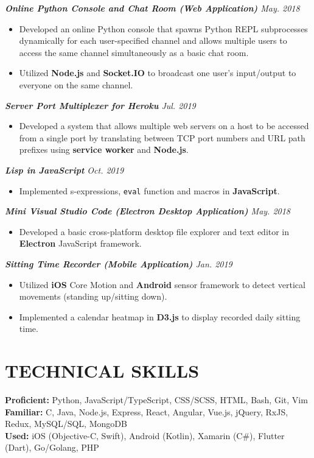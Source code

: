 \documentclass[10pt]{article}
\begin{document}
%
{\itshape {\bfseries Online Python Console and Chat Room (Web Application)}  \hfill May. 2018}
\begin{itemize}[leftmargin=15pt, noitemsep, topsep=0pt]
\item Developed an online Python console that spawns Python REPL subprocesses dynamically for each user-specified channel and allows multiple users to access the same channel simultaneously as a basic chat room.
\item Utilized \textbf{Node.js} and \textbf{Socket.IO} to broadcast one user’s input/output to everyone on the same channel.
\end{itemize}
\vspace{0.5em}
%
{\itshape {\bfseries Server Port Multiplexer for Heroku}  \hfill Jul. 2019}
\begin{itemize}[leftmargin=15pt, noitemsep, topsep=0pt]
\item Developed a system that allows multiple web servers on a host to be accessed from a single port by translating between TCP port numbers and URL path prefixes using \textbf{service worker} and \textbf{Node.js}. 
\end{itemize}
\vspace{0.2em}
%
{\itshape {\bfseries Lisp in JavaScript}  \hfill Oct. 2019}
\begin{itemize}[leftmargin=15pt, noitemsep, topsep=0pt]
\item Implemented s-expressions, \texttt{eval} function and macros in \textbf{JavaScript}.
\end{itemize}
\vspace{0.2em}
%
{\itshape {\bfseries Mini Visual Studio Code (Electron Desktop Application)}  \hfill May. 2018}
\begin{itemize}[leftmargin=15pt, noitemsep, topsep=0pt]
\item Developed a basic cross-platform desktop file explorer and text editor in \textbf{Electron} JavaScript framework.
\end{itemize}
\vspace{0.2em}
%
{\itshape {\bfseries Sitting Time Recorder (Mobile Application)}  \hfill Jan. 2019}
\begin{itemize}[leftmargin=15pt, noitemsep, topsep=0pt]
\item Utilized \textbf{iOS} Core Motion and \textbf{Android} sensor framework to detect vertical movements (standing up/sitting down).
\item Implemented a calendar heatmap in \textbf{D3.js} to display recorded daily sitting time.
\end{itemize}
%
\vspace{-0.5em}
\section*{TECHNICAL SKILLS}
\textbf{Proficient:} Python, JavaScript/TypeScript, CSS/SCSS, HTML, Bash, Git, Vim\\
\textbf{Familiar:} C, Java, Node.js, Express, React, Angular, Vue.js, jQuery, RxJS, Redux, MySQL/SQL, MongoDB\\
\textbf{Used:} iOS (Objective-C, Swift), Android (Kotlin), Xamarin (C\#), Flutter (Dart), Go/Golang, PHP
\end{document}
